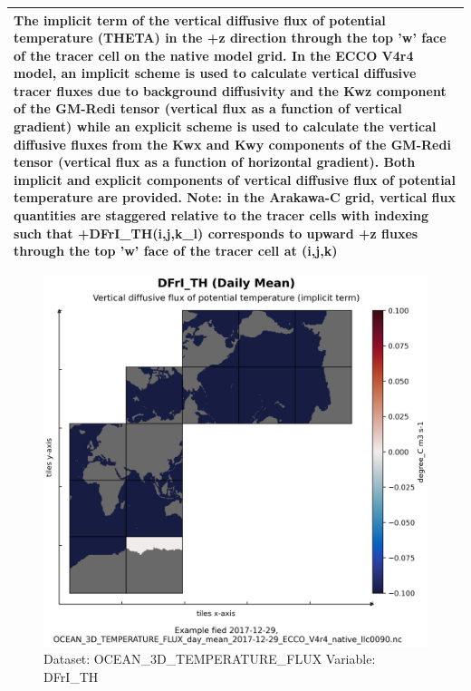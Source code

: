 \begin{longtable}{|m{}|m{}|m{}|m{}|}
\multicolumn{4}{|p{1\textwidth}|}{The implicit term of the vertical diffusive flux of potential temperature (THETA) in the +z direction through the top 'w' face of the tracer cell on the native model grid. In the ECCO V4r4 model, an implicit scheme is used to calculate vertical diffusive tracer fluxes due to background diffusivity and the Kwz component of the GM-Redi tensor (vertical flux as a function of vertical gradient) while an explicit scheme is used to calculate the vertical diffusive fluxes from the Kwx and Kwy components of the GM-Redi tensor (vertical flux as a function of horizontal gradient). Both implicit and explicit components of vertical diffusive flux of potential temperature are provided. Note: in the Arakawa-C grid, vertical flux quantities are staggered relative to the tracer cells with indexing such that +DFrI\_TH(i,j,k\_l) corresponds to upward +z fluxes through the top 'w' face of the tracer cell at (i,j,k)} \\ \hline
\end{longtable}

\begin{figure}[H]
\centering
\includegraphics[scale=0.55]{../images/plots/native_plots/Ocean_Three-Dimensional_Potential_Temperature_Fluxes/DFrI_TH.png}
\caption{Dataset: OCEAN\_3D\_TEMPERATURE\_FLUX Variable: DFrI\_TH}
\label{tab:table-OCEAN_3D_TEMPERATURE_FLUX_DFrI_TH-Plot}
\end{figure}
\pagebreak
